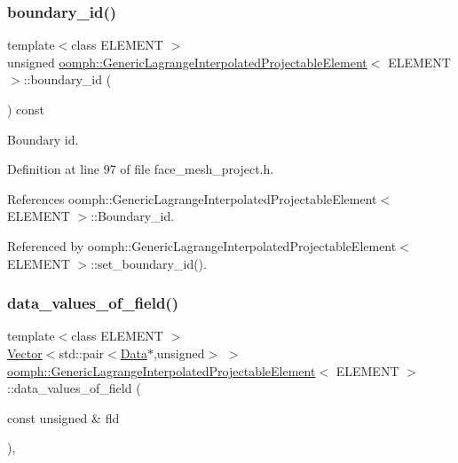 \subsubsection{\texorpdfstring{boundary\+\_\+id()}{boundary\_id()}}
{\footnotesize\ttfamily template$<$class E\+L\+E\+M\+E\+NT $>$ \\
unsigned \hyperlink{classoomph_1_1GenericLagrangeInterpolatedProjectableElement}{oomph\+::\+Generic\+Lagrange\+Interpolated\+Projectable\+Element}$<$ E\+L\+E\+M\+E\+NT $>$\+::boundary\+\_\+id (\begin{DoxyParamCaption}{ }\end{DoxyParamCaption}) const\hspace{0.3cm}{\ttfamily [inline]}}



Boundary id. 



Definition at line 97 of file face\+\_\+mesh\+\_\+project.\+h.



References oomph\+::\+Generic\+Lagrange\+Interpolated\+Projectable\+Element$<$ E\+L\+E\+M\+E\+N\+T $>$\+::\+Boundary\+\_\+id.



Referenced by oomph\+::\+Generic\+Lagrange\+Interpolated\+Projectable\+Element$<$ E\+L\+E\+M\+E\+N\+T $>$\+::set\+\_\+boundary\+\_\+id().

\mbox{\label{classoomph_1_1GenericLagrangeInterpolatedProjectableElement_abbf541f3b88a4b0acc89f4b6f252de3b}} 
\subsubsection{\texorpdfstring{data\+\_\+values\+\_\+of\+\_\+field()}{data\_values\_of\_field()}}
{\footnotesize\ttfamily template$<$class E\+L\+E\+M\+E\+NT $>$ \\
\hyperlink{classoomph_1_1Vector}{Vector}$<$std\+::pair$<$\hyperlink{classoomph_1_1Data}{Data}$\ast$,unsigned$>$ $>$ \hyperlink{classoomph_1_1GenericLagrangeInterpolatedProjectableElement}{oomph\+::\+Generic\+Lagrange\+Interpolated\+Projectable\+Element}$<$ E\+L\+E\+M\+E\+NT $>$\+::data\+\_\+values\+\_\+of\+\_\+field (\begin{DoxyParamCaption}\item[{const unsigned \&}]{fld }\end{DoxyParamCaption})\hspace{0.3cm}{\ttfamily [inline]}, {\ttfamily [virtual]}}



